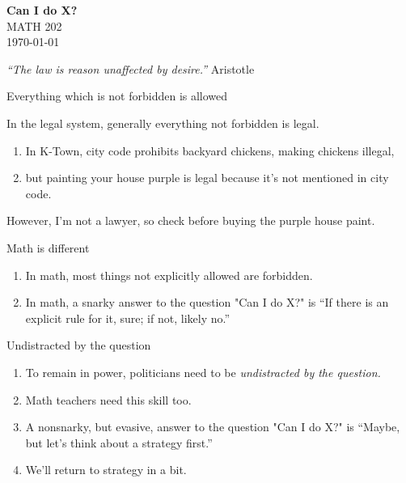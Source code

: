 \documentclass[portrait,fleqn,12pt]{beamer}
\newenvironment{handlist}
   {\begin{enumerate}[\faHandPointRight]
       \addtolength{\itemsep}{0.0\itemsep}}
     {\end{enumerate}}
\begin{document}
\begin{frame}
\begin{flushleft} 
\textbf{Can I do X?} \\
MATH 202 \\
\today 
\end{flushleft}


\emph{“The law is reason unaffected by desire.”} \hfill {\sc Aristotle } 
\end{frame}


\begin{frame}[fragile]{Everything which is not forbidden is allowed}

In the legal system, generally everything not forbidden is legal.  

\begin{handlist}
 \item In K-Town, city code prohibits backyard chickens, making  chickens illegal, 
 
 \item but painting your house purple is legal because it's not mentioned in city code.
 \end{handlist}
 
 However, I'm not a lawyer, so check before buying the purple house paint.
\end{frame}
 
\begin{frame}{Math is different}
 
\begin{handlist}
\item[\faHandPointRight] In math, most things not explicitly allowed are forbidden.
\item[\faHandPointRight] In math, a snarky answer to the question 
"Can I do X?"  is ``If there is an explicit  rule for it, sure; if not, likely no.''
\end{handlist}
 \vfill
\end{frame}

\begin{frame}{Undistracted by the question}

\begin{handlist}
\item To remain in power, politicians need to be \emph{undistracted by the question.}

\item Math teachers need this skill too.

\item A nonsnarky, but evasive,  answer to the question  "Can I do X?" is ``Maybe, but let's think about a strategy first.'' 

\item We'll return to strategy in a bit.
\end{handlist}
\end{frame}
\end{document}

